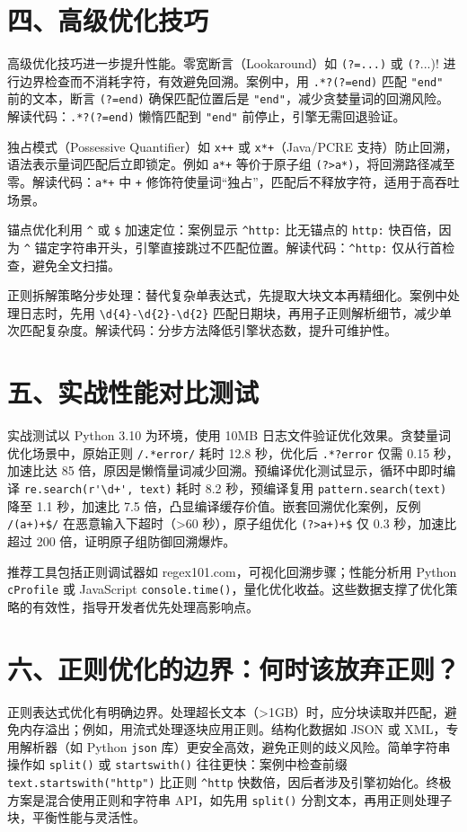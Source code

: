 \chapter{四、高级优化技巧}
高级优化技巧进一步提升性能。零宽断言（Lookaround）如 \verb!(?=...)! 或 \verb!(?!...)! 进行边界检查而不消耗字符，有效避免回溯。案例中，用 \verb!.*?(?=end)! 匹配 \verb!"end"! 前的文本，断言 \verb!(?=end)! 确保匹配位置后是 \verb!"end"!，减少贪婪量词的回溯风险。解读代码：\verb!.*?(?=end)! 懒惰匹配到 \verb!"end"! 前停止，引擎无需回退验证。\par
独占模式（Possessive Quantifier）如 \verb!x++! 或 \verb!x*+!（Java/PCRE 支持）防止回溯，语法表示量词匹配后立即锁定。例如 \verb!a*+! 等价于原子组 \verb!(?>a*)!，将回溯路径减至零。解读代码：\verb!a*+! 中 \verb!+! 修饰符使量词“独占”，匹配后不释放字符，适用于高吞吐场景。\par
锚点优化利用 \verb!^! 或 \verb!$! 加速定位：案例显示 \verb!^http:! 比无锚点的 \verb!http:! 快百倍，因为 \verb!^! 锚定字符串开头，引擎直接跳过不匹配位置。解读代码：\verb!^http:! 仅从行首检查，避免全文扫描。\par
正则拆解策略分步处理：替代复杂单表达式，先提取大块文本再精细化。案例中处理日志时，先用 \verb!\d{4}-\d{2}-\d{2}! 匹配日期块，再用子正则解析细节，减少单次匹配复杂度。解读代码：分步方法降低引擎状态数，提升可维护性。\par
\chapter{五、实战性能对比测试}
实战测试以 Python 3.10 为环境，使用 10MB 日志文件验证优化效果。贪婪量词优化场景中，原始正则 \verb!/.*error/! 耗时 12.8 秒，优化后 \verb!.*?error! 仅需 0.15 秒，加速比达 85 倍，原因是懒惰量词减少回溯。预编译优化测试显示，循环中即时编译 \verb!re.search(r'\d+', text)! 耗时 8.2 秒，预编译复用 \verb!pattern.search(text)! 降至 1.1 秒，加速比 7.5 倍，凸显编译缓存价值。嵌套回溯优化案例，反例 \verb!/(a+)+$/! 在恶意输入下超时（>60 秒），原子组优化 \verb!(?>a+)+$! 仅 0.3 秒，加速比超过 200 倍，证明原子组防御回溯爆炸。\par
推荐工具包括正则调试器如 regex101.com，可视化回溯步骤；性能分析用 Python \verb!cProfile! 或 JavaScript \verb!console.time()!，量化优化收益。这些数据支撑了优化策略的有效性，指导开发者优先处理高影响点。\par
\chapter{六、正则优化的边界：何时该放弃正则？}
正则表达式优化有明确边界。处理超长文本（>1GB）时，应分块读取并匹配，避免内存溢出；例如，用流式处理逐块应用正则。结构化数据如 JSON 或 XML，专用解析器（如 Python \verb!json! 库）更安全高效，避免正则的歧义风险。简单字符串操作如 \verb!split()! 或 \verb!startswith()! 往往更快：案例中检查前缀 \verb!text.startswith("http")! 比正则 \verb!^http! 快数倍，因后者涉及引擎初始化。终极方案是混合使用正则和字符串 API，如先用 \verb!split()! 分割文本，再用正则处理子块，平衡性能与灵活性。\par
